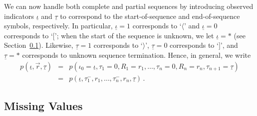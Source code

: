 \documentclass[a4paper]{article}
\newcommand{\ui}{\underline{\iota}}
\newcommand{\ut}{\underline{\tau}}
\newcommand{\vr}{\vec{r}}
\newcommand{\tm}{\tau^{-}}
\begin{document}
We can now handle both complete and partial sequences by introducing observed indicators $\ui$ and $\ut$
to correspond to the start-of-sequence and end-of-sequence symbols, respectively.
In particular, $\ui=1$ corresponds to `$\langle$' and $\ui=0$ corresponds to `$[$'; when the start of the sequence is unknown,
we let $\ui=*$ (see Section~\ref{sec:missing-values}). Likewise, $\ut=1$ corresponds to `$\rangle$', $\ut=0$ corresponds to `$]$', and
$\ut=*$ corresponds to unknown sequence termination.
Hence, in general, we write
\begin{eqnarray}
p(\ui,\vr,\ut)
& = & p(\iota_0\!=\!\ui,\tau_1\!=\!0,R_1\!=\!r_1,\ldots,\tau_n\!=\!0,R_n\!=\!r_n,\tau_{n+1}\!=\!\ut)
\nonumber\\
& = & p(\ui,\tm_1,r_1,\ldots,\tm_n,r_n,\ut)\,.
\label{eq:pr:gen}
\end{eqnarray}

\subsection{Missing Values}\label{sec:missing-values}
\end{document}
